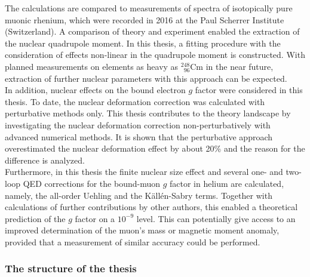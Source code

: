 The calculations are compared to measurements of spectra of isotopically pure muonic rhenium, which were recorded in 2016 at the Paul Scherrer Institute (Switzerland). A comparison of theory and experiment enabled the extraction of the nuclear quadrupole moment. In this thesis, a fitting procedure with the consideration of effects non-linear in the quadrupole moment is constructed.
With planned measurements on elements as heavy as $^{248}_{\phantom{1}96}\text{Cm}$ in the near future, extraction of further nuclear parameters with this approach can be expected.\\[11pt]%
In addition, nuclear effects on the bound electron $g$ factor were considered in this thesis. To date, the nuclear deformation correction was calculated with perturbative methods only. This thesis contributes to the theory landscape by investigating the nuclear deformation correction non-perturbatively with advanced numerical methods. It is shown that the perturbative approach overestimated the nuclear deformation effect by about 20\% and the reason for the difference is analyzed.\\[11pt]%
Furthermore, in this thesis the finite nuclear size effect and several one- and two-loop QED corrections for the bound-muon $g$ factor in helium are calculated, namely, the all-order Uehling and the Källén-Sabry terms. Together with calculations of further contributions by other authors, this enabled a theoretical prediction of the $g$ factor on a $10^{-9}$ level. This can potentially give access to an improved determination of the muon's mass or magnetic moment anomaly, provided that a measurement of similar accuracy could be performed.


\subsubsection*{The structure of the thesis}

